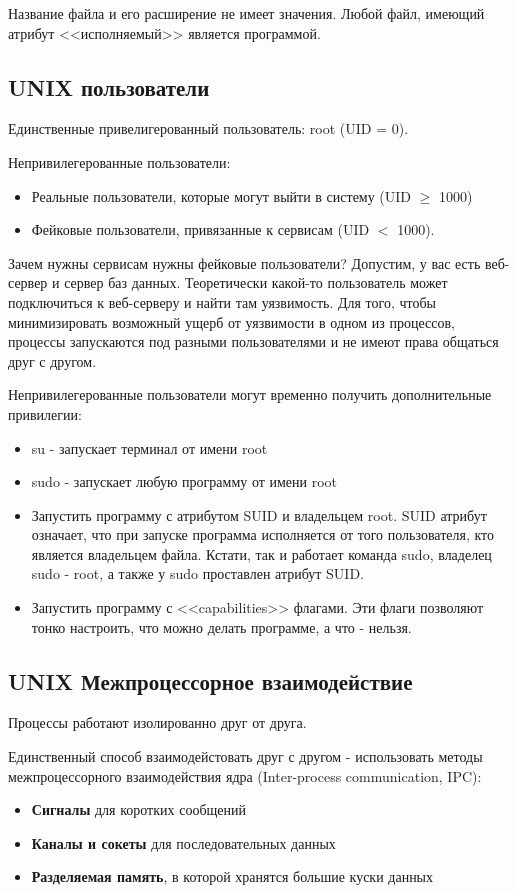 Название файла и его расширение не имеет значения. Любой файл, имеющий атрибут 
<<исполняемый>> является программой.

\subsection{UNIX пользователи}

Единственные привелигерованный пользователь: root (UID = 0).

Непривилегерованные пользователи:
\begin{itemize}
	\item Реальные пользователи, которые могут выйти в систему (UID $\ge$ 1000)
	\item Фейковые пользователи, привязанные к сервисам (UID $<$ 1000).
\end{itemize}

Зачем нужны сервисам нужны фейковые пользователи?
Допустим, у вас есть веб-сервер и сервер баз данных. Теоретически какой-то пользователь
может подключиться к веб-серверу и найти там уязвимость. Для того, чтобы 
минимизировать возможный ущерб от уязвимости в одном из процессов, процессы запускаются
под разными пользователями и не имеют права общаться друг с другом.

Непривилегерованные пользователи могут временно получить 
дополнительные привилегии:
\begin{itemize}
	\item su - запускает терминал от имени root
	\item sudo - запускает любую программу от имени root
	\item Запустить программу с атрибутом SUID и владельцем root. SUID атрибут означает, что при запуске программа
	исполняется от того пользователя, кто является владельцем файла. Кстати, так и 
	работает команда sudo, владелец sudo - root, а также у sudo проставлен атрибут SUID.
	\item Запустить программу с <<capabilities>> флагами. Эти флаги позволяют тонко настроить, что можно делать программе, а что - нельзя.
\end{itemize}

\subsection{UNIX Межпроцессорное взаимодействие}

Процессы работают изолированно друг от друга.

Единственный способ взаимодейстовать друг с другом - использовать методы межпроцессорного взаимодействия ядра (Inter-process communication, IPC):
\begin{itemize}
	\item \textbf{Сигналы} для коротких сообщений
	\item \textbf{Каналы и сокеты} для последовательных данных
	\item \textbf{Разделяемая память}, в которой хранятся большие куски данных
\end{itemize}

